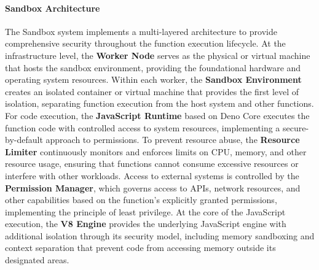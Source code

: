 \documentclass[11pt]{article}
\begin{document}
\paragraph{Sandbox Architecture}
The Sandbox system implements a multi-layered architecture to provide comprehensive security throughout the function execution lifecycle. At the infrastructure level, the \textbf{Worker Node} serves as the physical or virtual machine that hosts the sandbox environment, providing the foundational hardware and operating system resources. Within each worker, the \textbf{Sandbox Environment} creates an isolated container or virtual machine that provides the first level of isolation, separating function execution from the host system and other functions. For code execution, the \textbf{JavaScript Runtime} based on Deno Core executes the function code with controlled access to system resources, implementing a secure-by-default approach to permissions. To prevent resource abuse, the \textbf{Resource Limiter} continuously monitors and enforces limits on CPU, memory, and other resource usage, ensuring that functions cannot consume excessive resources or interfere with other workloads. Access to external systems is controlled by the \textbf{Permission Manager}, which governs access to APIs, network resources, and other capabilities based on the function's explicitly granted permissions, implementing the principle of least privilege. At the core of the JavaScript execution, the \textbf{V8 Engine} provides the underlying JavaScript engine with additional isolation through its security model, including memory sandboxing and context separation that prevent code from accessing memory outside its designated areas.
\end{document}
